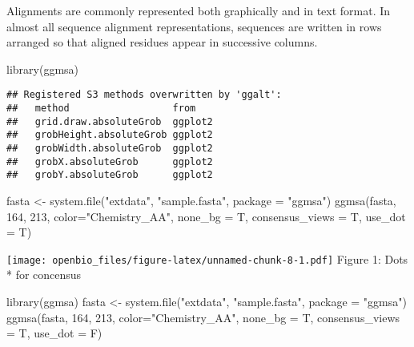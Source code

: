 \documentclass[
]{book}
\newenvironment{Shaded}{\begin{snugshade}}{\end{snugshade}}
\newcommand{\AttributeTok}[1]{\textcolor[rgb]{0.77,0.63,0.00}{#1}}
\newcommand{\DecValTok}[1]{\textcolor[rgb]{0.00,0.00,0.81}{#1}}
\newcommand{\FunctionTok}[1]{\textcolor[rgb]{0.00,0.00,0.00}{#1}}
\newcommand{\NormalTok}[1]{#1}
\newcommand{\OtherTok}[1]{\textcolor[rgb]{0.56,0.35,0.01}{#1}}
\newcommand{\StringTok}[1]{\textcolor[rgb]{0.31,0.60,0.02}{#1}}
\begin{document}
Alignments are commonly represented both graphically and in text format. In almost all sequence alignment representations, sequences are written in rows arranged so that aligned residues appear in successive columns.

\begin{Shaded}
\begin{Highlighting}[]
\FunctionTok{library}\NormalTok{(ggmsa)}
\end{Highlighting}
\end{Shaded}

\begin{verbatim}
## Registered S3 methods overwritten by 'ggalt':
##   method                  from   
##   grid.draw.absoluteGrob  ggplot2
##   grobHeight.absoluteGrob ggplot2
##   grobWidth.absoluteGrob  ggplot2
##   grobX.absoluteGrob      ggplot2
##   grobY.absoluteGrob      ggplot2
\end{verbatim}

\begin{Shaded}
\begin{Highlighting}[]
\NormalTok{fasta }\OtherTok{\textless{}{-}} \FunctionTok{system.file}\NormalTok{(}\StringTok{"extdata"}\NormalTok{, }\StringTok{"sample.fasta"}\NormalTok{, }\AttributeTok{package =} \StringTok{"ggmsa"}\NormalTok{)}
\FunctionTok{ggmsa}\NormalTok{(fasta, }\DecValTok{164}\NormalTok{, }\DecValTok{213}\NormalTok{, }\AttributeTok{color=}\StringTok{"Chemistry\_AA"}\NormalTok{, }\AttributeTok{none\_bg =}\NormalTok{ T,}
      \AttributeTok{consensus\_views =}\NormalTok{ T, }
      \AttributeTok{use\_dot =}\NormalTok{ T)}
\end{Highlighting}
\end{Shaded}

\texttt{[image: openbio\_files/figure-latex/unnamed-chunk-8-1.pdf]}
Figure 1: Dots * for concensus

\begin{Shaded}
\begin{Highlighting}[]
\FunctionTok{library}\NormalTok{(ggmsa)}
\NormalTok{fasta }\OtherTok{\textless{}{-}} \FunctionTok{system.file}\NormalTok{(}\StringTok{"extdata"}\NormalTok{, }\StringTok{"sample.fasta"}\NormalTok{, }\AttributeTok{package =} \StringTok{"ggmsa"}\NormalTok{)}
\FunctionTok{ggmsa}\NormalTok{(fasta, }\DecValTok{164}\NormalTok{, }\DecValTok{213}\NormalTok{, }\AttributeTok{color=}\StringTok{"Chemistry\_AA"}\NormalTok{, }\AttributeTok{none\_bg =}\NormalTok{ T,}
      \AttributeTok{consensus\_views =}\NormalTok{ T, }
      \AttributeTok{use\_dot =}\NormalTok{ F)}
\end{Highlighting}
\end{Shaded}
\end{document}
